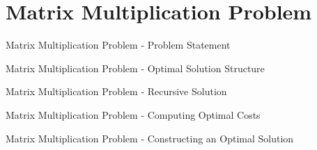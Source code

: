 \section{Matrix Multiplication Problem}


\begin{frame}{Matrix Multiplication Problem - Problem Statement}
  
\end{frame}


\begin{frame}{Matrix Multiplication Problem - Optimal Solution Structure}
  
\end{frame}

\begin{frame}{Matrix Multiplication Problem - Recursive Solution}
  
\end{frame}

\begin{frame}{Matrix Multiplication Problem - Computing Optimal Costs}
  
\end{frame}

\begin{frame}{Matrix Multiplication Problem - Constructing an Optimal Solution}
  
\end{frame}